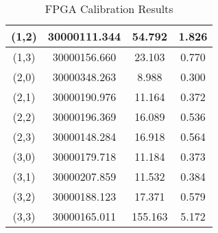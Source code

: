 \begin{table}
\begin{center}
\begin{tabular}{|c|c|c|c|}
			\hline
			(1,2) & 30000111.344 & 54.792 & 1.826 \\
			\hline
			(1,3) & 30000156.660 & 23.103 & 0.770 \\
			\hline
			(2,0) & 30000348.263 & 8.988 & 0.300 \\
			\hline
			(2,1) & 30000190.976 & 11.164 & 0.372 \\
			\hline
			(2,2) & 30000196.369 & 16.089 & 0.536 \\
			\hline
			(2,3) & 30000148.284 & 16.918 & 0.564 \\
			\hline
			(3,0) & 30000179.718 & 11.184 & 0.373 \\
			\hline
			(3,1) & 30000207.859 & 11.532 & 0.384 \\
			\hline
			(3,2) & 30000188.123 & 17.371 & 0.579 \\
			\hline
			(3,3) & 30000165.011 & 155.163 & 5.172 \\
			\hline
		\end{tabular}
	\end{center}
	\caption{FPGA Calibration Results}
	\label{tab:fpga_calibration}
\end{table}